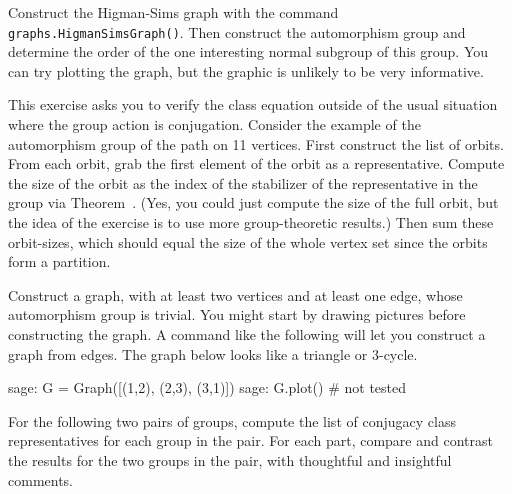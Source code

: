 \begin{sageverbatim}\end{sageverbatim}
%
%
Construct the Higman-Sims graph with the command \verb?graphs.HigmanSimsGraph()?.  Then construct the automorphism group and determine the order of the one interesting normal subgroup of this group.  You can try plotting the graph, but the graphic is unlikely to be very informative.
\begin{sageverbatim}\end{sageverbatim}
%
%
This exercise asks you to verify the class equation outside of the usual situation where the group action is conjugation.  Consider the example of the automorphism group of the path on 11 vertices.  First construct the list of orbits.  From each orbit, grab the first element of the orbit as a representative.  Compute the size of the orbit as the index of the stabilizer of the representative in the group via Theorem~.  (Yes, you could just compute the size of the full orbit, but the idea of the exercise is to use more group-theoretic results.)  Then sum these orbit-sizes, which should equal the size of the whole vertex set since the orbits form a partition.
\begin{sageverbatim}\end{sageverbatim}
%
%
Construct a graph, with at least two vertices and at least one edge, whose automorphism group is trivial.  You might start by drawing pictures before constructing the graph.  A command like the following will let you construct a graph from edges.  The graph below looks like a triangle or $3$-cycle.
%
\begin{sageexample}
sage: G = Graph([(1,2), (2,3), (3,1)])
sage: G.plot()            # not tested
\end{sageexample}
%
\begin{sageverbatim}\end{sageverbatim}
%
%
For the following two pairs of groups, compute the list of conjugacy class representatives for each group in the pair.  For each part, compare and contrast the results for the two groups in the pair, with thoughtful and insightful comments.\\
